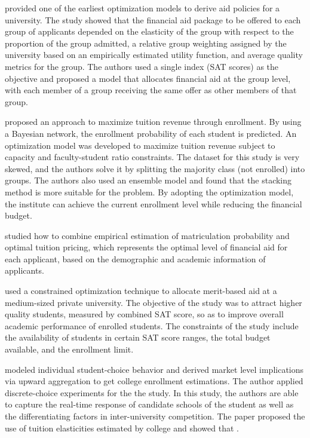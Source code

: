 \documentclass[12pt,english]{report}
\begin{document}
\vspace{0.15in}

\citet{Ehrenberg1984} provided one of the earliest optimization models to derive aid policies for a university. The study showed that the financial aid package to be offered to each group of applicants depended on the elasticity of the group with respect to the proportion of the group admitted, a relative group weighting assigned by the university based on an empirically estimated utility function, and average quality metrics for the group. The authors used a single index (SAT scores) as the objective and proposed a model that allocates financial aid at the group level, with each member of a group receiving the same offer as other members of that group.

\citet{Thanh2007} proposed an approach to maximize tuition revenue  through enrollment. By using a Bayesian network, the enrollment probability  of each student is predicted.  An optimization model was developed to  maximize  tuition revenue subject to capacity and faculty-student ratio constraints. The dataset for this study is very skewed, and the authors solve it by splitting the majority class (not enrolled) into groups. The authors  also used an ensemble model and found that the stacking method  is more  suitable for the problem. By adopting the optimization model, the institute  can achieve the current enrollment level while reducing the financial budget.

\citet{Bosshardt2010} studied how to combine empirical estimation of matriculation probability and optimal tuition pricing, which represents the optimal level of financial aid for each applicant, based on the demographic  and academic information of applicants.

\citet{Sugrue2010} used a constrained optimization technique to allocate merit-based aid at a medium-sized private university. The objective of the study was to attract higher quality students, measured by combined SAT score,  so as to improve overall academic performance of enrolled students. The constraints of the study include the availability of students in certain SAT score ranges, the total budget available, and the enrollment limit.


\citet{Carter2011} modeled individual student-choice behavior and derived market level implications via upward aggregation to get college enrollment estimations. The author applied  discrete-choice
experiments for the the study. In this study, the authors are able to capture the real-time response of 
candidate schools of the student as well as the differentiating factors in inter-university competition.
The paper proposed the use of tuition elasticities estimated by college and showed that .
\end{document}
